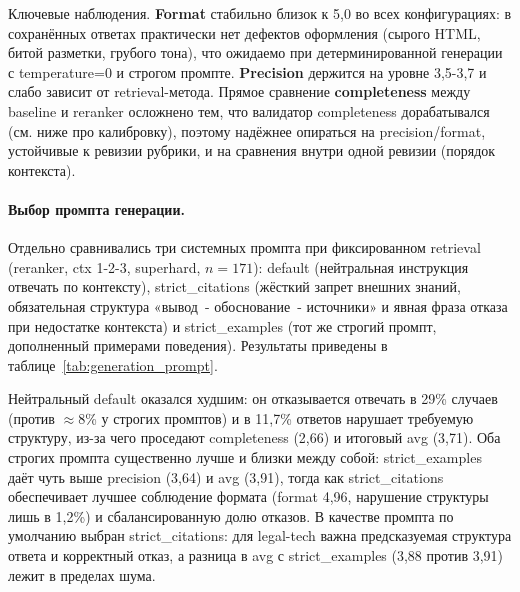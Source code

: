 \documentclass[a4paper,12pt]{article}
\begin{document}
Ключевые наблюдения. \textbf{Format} стабильно близок к 5,0 во всех конфигурациях: в сохранённых ответах практически нет дефектов оформления (сырого HTML, битой разметки, грубого тона), что ожидаемо при детерминированной генерации с temperature=0 и строгом промпте. \textbf{Precision} держится на уровне 3,5-3,7 и слабо зависит от retrieval-метода. Прямое сравнение \textbf{completeness} между baseline и reranker осложнено тем, что валидатор completeness дорабатывался (см. ниже про калибровку), поэтому надёжнее опираться на precision/format, устойчивые к ревизии рубрики, и на сравнения внутри одной ревизии (порядок контекста).

\paragraph{Выбор промпта генерации.}

Отдельно сравнивались три системных промпта при фиксированном retrieval (reranker, ctx 1-2-3, superhard, $n=171$): default (нейтральная инструкция отвечать по контексту), strict\_citations (жёсткий запрет внешних знаний, обязательная структура «вывод~- обоснование~- источники» и явная фраза отказа при недостатке контекста) и strict\_examples (тот же строгий промпт, дополненный примерами поведения). Результаты приведены в таблице~\ref{tab:generation_prompt}.

\begin{table}[H]
\centering
\caption{Сравнение промптов генерации (reranker, ctx 1-2-3, superhard, $n=171$)}
\label{tab:generation_prompt}
\end{table}
\FloatBarrier

Нейтральный default оказался худшим: он отказывается отвечать в 29\% случаев (против $\approx$8\% у строгих промптов) и в 11,7\% ответов нарушает требуемую структуру, из-за чего проседают completeness (2,66) и итоговый avg (3,71). Оба строгих промпта существенно лучше и близки между собой: strict\_examples даёт чуть выше precision (3,64) и avg (3,91), тогда как strict\_citations обеспечивает лучшее соблюдение формата (format 4,96, нарушение структуры лишь в 1,2\%) и сбалансированную долю отказов. В качестве промпта по умолчанию выбран strict\_citations: для legal-tech важна предсказуемая структура ответа и корректный отказ, а разница в avg с strict\_examples (3,88 против 3,91) лежит в пределах шума.
\end{document}
